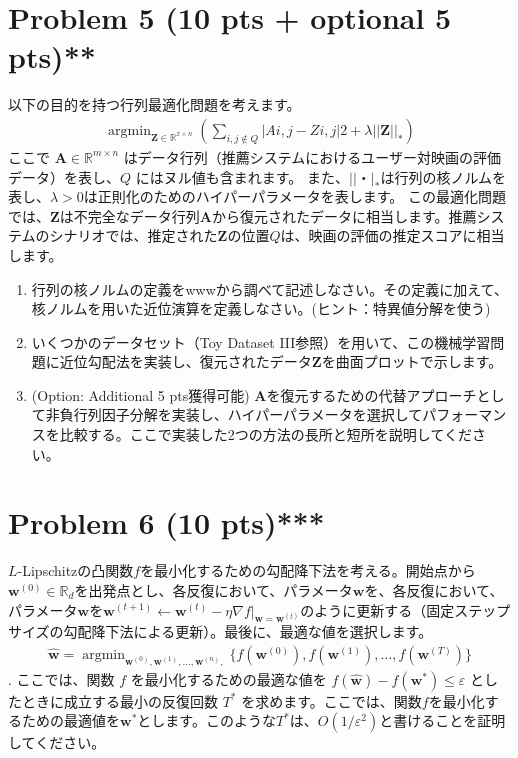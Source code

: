 \documentclass{jsarticle}
\DeclareMathOperator*{\argmin}{argmin}
\begin{document}
\section*{Problem 5 (10 pts + optional 5 pts)**}
以下の目的を持つ行列最適化問題を考えます。
\begin{align*}
  \argmin_{\bm Z\in\mathbb R^{x\times n}} \left( \sum_{i,j\notin Q} |Ai,j − Zi,j |2 + λ||\bm Z||_*\right)
\end{align*}
ここで $\bm A \in \mathbb R^{m\times n}$ はデータ行列（推薦システムにおけるユーザー対映画の評価データ）を表し、$Q$ にはヌル値も含まれます。
また、$||・|_*$は行列の核ノルムを表し、$\lambda > 0$は正則化のためのハイパーパラメータを表します。
この最適化問題では、$\bm Z$は不完全なデータ行列$\bm A$から復元されたデータに相当します。推薦システムのシナリオでは、推定された$\bm Z$の位置$Q$は、映画の評価の推定スコアに相当します。
\begin{enumerate}
  \item 行列の核ノルムの定義をwwwから調べて記述しなさい。その定義に加えて、核ノルムを用いた近位演算を定義しなさい。(ヒント：特異値分解を使う)
  \item いくつかのデータセット（Toy Dataset III参照）を用いて、この機械学習問題に近位勾配法を実装し、復元されたデータ$\bm Z$を曲面プロットで示します。
  \item (Option: Additional 5 pts獲得可能) $\bm A$を復元するための代替アプローチとして非負行列因子分解を実装し、ハイパーパラメータを選択してパフォーマンスを比較する。ここで実装した2つの方法の長所と短所を説明してください。
\end{enumerate}

\section*{Problem 6 (10 pts)***}
$L$-Lipschitzの凸関数$f$を最小化するための勾配降下法を考える。開始点から $\bm w^{(0)} \in \mathbb R_d$を出発点とし、各反復において、パラメータ$\bm w$を、各反復において、パラメータ$\bm w$を$\bm w^{(t+1)} \leftarrow \bm w^{(t)} − \eta \nabla f|_{\bm w=\bm w^{(t)}}$のように更新する（固定ステップサイズの勾配降下法による更新）。最後に、最適な値を選択します。
\begin{align*}
  \hat{\bm w} = \argmin_{\bm w^{(0)},\bm w^{(1)},\ldots,\bm w^{(n)},} \{f(\bm w^{(0)}),f(\bm w^{(1)}),\ldots,f(\bm w^{(T)})\}
\end{align*}
. ここでは、関数 $f$ を最小化するための最適な値を $f(\hat{\bm w})−f(\bm w^*) \le \varepsilon$ としたときに成立する最小の反復回数 $T^*$ を求めます。ここでは、関数$f$を最小化するための最適値を$\bm w^*$とします。このような$T^*$は、$O(1/\varepsilon^2)$と書けることを証明してください。
\end{document}
